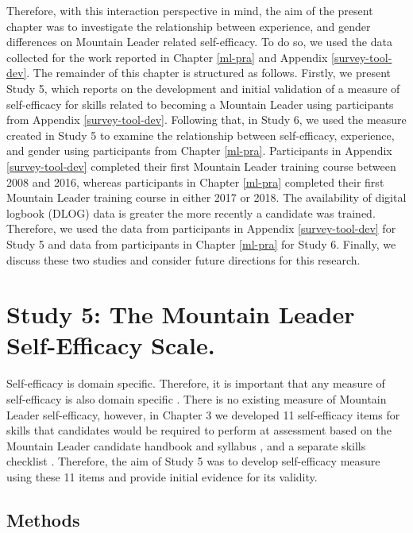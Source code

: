 \documentclass[
  12pt,
  a4paper,
]{book}
\begin{document}
Therefore, with this interaction perspective in mind, the aim of the present chapter was to investigate the relationship between experience, and gender differences on Mountain Leader related self-efficacy. To do so, we used the data collected for the work reported in Chapter \ref{ml-pra} and Appendix \ref{survey-tool-dev}. The remainder of this chapter is structured as follows. Firstly, we present Study 5, which reports on the development and initial validation of a measure of self-efficacy for skills related to becoming a Mountain Leader using participants from Appendix \ref{survey-tool-dev}. Following that, in Study 6, we used the measure created in Study 5 to examine the relationship between self-efficacy, experience, and gender using participants from Chapter \ref{ml-pra}. Participants in Appendix \ref{survey-tool-dev} completed their first Mountain Leader training course between 2008 and 2016, whereas participants in Chapter \ref{ml-pra} completed their first Mountain Leader training course in either 2017 or 2018. The availability of digital logbook (DLOG) data is greater the more recently a candidate was trained. Therefore, we used the data from participants in Appendix \ref{survey-tool-dev} for Study 5 and data from participants in Chapter \ref{ml-pra} for Study 6. Finally, we discuss these two studies and consider future directions for this research.

\hypertarget{study-5}{%
\section{Study 5: The Mountain Leader Self-Efficacy Scale.}\label{study-5}}

Self-efficacy is domain specific. Therefore, it is important that any measure of self-efficacy is also domain specific \citep{Bandura2006}. There is no existing measure of Mountain Leader self-efficacy, however, in Chapter 3 we developed 11 self-efficacy items for skills that candidates would be required to perform at assessment based on the Mountain Leader candidate handbook and syllabus \citep{MTUK2015a}, and a separate skills checklist \citep{MTUK2015}. Therefore, the aim of Study 5 was to develop self-efficacy measure using these 11 items and provide initial evidence for its validity.

\hypertarget{study5-methods}{%
\subsection{Methods}\label{study5-methods}}
\end{document}
